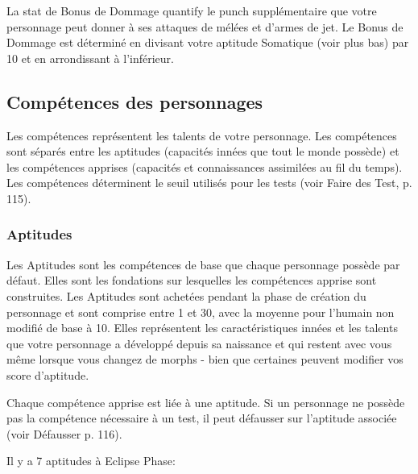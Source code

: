 La stat de Bonus de Dommage quantify le punch supplémentaire que votre personnage peut donner à ses attaques de mélées et d'armes de jet. Le Bonus de Dommage est déterminé en divisant votre aptitude Somatique (voir plus bas) par 10 et en arrondissant à l'inférieur. 

\subsection{Compétences des personnages} \label{sec:character-skills} 

Les compétences représentent les talents de votre personnage. Les compétences sont séparés entre les aptitudes (capacités innées que tout le monde possède) et les compétences apprises (capacités et connaissances assimilées au fil du temps). Les compétences déterminent le seuil utilisés pour les tests (voir Faire des Test, p. 115). 

\subsubsection{Aptitudes} \label{sec:aptitudes} 

Les Aptitudes sont les compétences de base que chaque personnage possède par défaut. Elles sont les fondations sur lesquelles les compétences apprise sont construites. Les Aptitudes sont achetées pendant la phase de création du personnage et sont comprise entre 1 et 30, avec la moyenne pour l'humain non modifié de base à 10. Elles représentent les caractéristiques innées et les talents que votre personnage a développé depuis sa naissance et qui restent avec vous même lorsque vous changez de morphs - bien que certaines peuvent modifier vos score d'aptitude. 

Chaque compétence apprise est liée à une aptitude. Si un personnage ne possède pas la compétence nécessaire à un test, il peut défausser sur l'aptitude associée (voir Défausser p. 116). 

Il y a 7 aptitudes à Eclipse Phase: 

